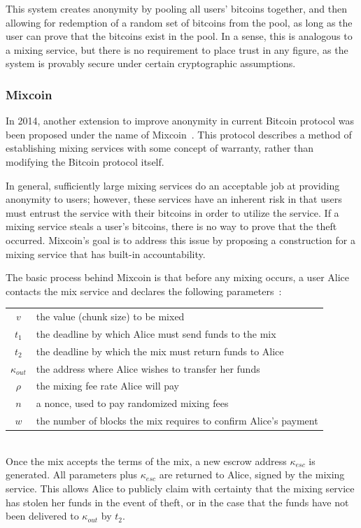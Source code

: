 \documentclass[11pt]{article}
\begin{document}
This system creates anonymity by pooling all users' bitcoins together, and then
allowing for redemption of a random set of bitcoins from the pool, as long as
the user can prove that the bitcoins exist in the pool. In a sense, this is
analogous to a mixing service, but there is no requirement to place trust in any
figure, as the system is provably secure under certain cryptographic
assumptions.

\subsubsection{Mixcoin}
In 2014, another extension to improve anonymity in current Bitcoin protocol
was been proposed under the name of Mixcoin~\cite{bonneau14}. This protocol
describes a method of establishing mixing services with some concept of
warranty, rather than modifying the Bitcoin protocol itself.

In general, sufficiently large mixing services do an acceptable job at providing
anonymity to users; however, these services have an inherent risk in that users
must entrust the service with their bitcoins in order to utilize the service.
If a mixing service steals a user's bitcoins, there is no way to prove that the
theft occurred. Mixcoin's goal is to address this issue by proposing a
construction for a mixing service that has built-in accountability.

The basic process behind Mixcoin is that before any mixing occurs, a user Alice
contacts the mix service and declares the following
parameters~\cite{bonneau14}:\\
\begin{tabular}{cl}
    $v$ & the value (chunk size) to be mixed\\
    $t_1$ & the deadline by which Alice must send funds to the mix\\
    $t_2$ & the deadline by which the mix must return funds to Alice\\
    $\kappa_{out}$ & the address where Alice wishes to transfer her funds\\
    $\rho$ & the mixing fee rate Alice will pay\\
    $n$ & a nonce, used to pay randomized mixing fees\\
    $w$ & the number of blocks the mix requires to confirm Alice's payment
\end{tabular}\vspace{1em}\\
Once the mix accepts the terms of the mix, a new escrow address $\kappa_{esc}$
is generated. All parameters plus $\kappa_{esc}$ are returned to Alice, signed
by the mixing service. This allows Alice to publicly claim with certainty that
the mixing service has stolen her funds in the event of theft, or in the case
that the funds have not been delivered to $\kappa_{out}$ by $t_2$.
\end{document}
